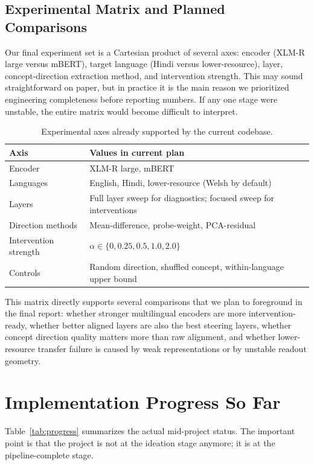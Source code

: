 \documentclass[11pt]{article}
\newcommand{\modelmain}{XLM-R large\xspace}
\newcommand{\modelaux}{mBERT\xspace}
\begin{document}
\subsection{Experimental Matrix and Planned Comparisons}
Our final experiment set is a Cartesian product of several axes: encoder (\modelmain versus \modelaux), target language (Hindi versus lower-resource), layer, concept-direction extraction method, and intervention strength. This may sound straightforward on paper, but in practice it is the main reason we prioritized engineering completeness before reporting numbers. If any one stage were unstable, the entire matrix would become difficult to interpret.

\begin{table}[t]
\centering
\small
\begin{tabular}{p{}p{}}
\toprule
\textbf{Axis} & \textbf{Values in current plan} \\
\midrule
Encoder & XLM-R large, mBERT \\
Languages & English, Hindi, lower-resource (Welsh by default) \\
Layers & Full layer sweep for diagnostics; focused sweep for interventions \\
Direction methods & Mean-difference, probe-weight, PCA-residual \\
Intervention strength & $\alpha \in \{0, 0.25, 0.5, 1.0, 2.0\}$ \\
Controls & Random direction, shuffled concept, within-language upper bound \\
\bottomrule
\end{tabular}
\caption{Experimental axes already supported by the current codebase.}
\label{tab:matrix}
\end{table}

This matrix directly supports several comparisons that we plan to foreground in the final report: whether stronger multilingual encoders are more intervention-ready, whether better aligned layers are also the best steering layers, whether concept direction quality matters more than raw alignment, and whether lower-resource transfer failure is caused by weak representations or by unstable readout geometry.

\section{Implementation Progress So Far}
Table~\ref{tab:progress} summarizes the actual mid-project status. The important point is that the project is not at the ideation stage anymore; it is at the pipeline-complete stage.
\end{document}
